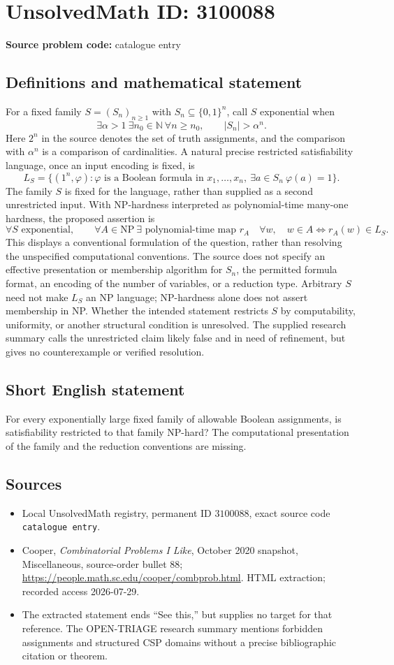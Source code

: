 \documentclass[11pt]{article}
\newcommand{\N}{\mathbb{N}}
\begin{document}
\section*{UnsolvedMath ID: 3100088}
\textbf{Source problem code:} catalogue entry
\subsection{Definitions and mathematical statement}
For a fixed family \(S=(S_n)_{n\ge1}\) with \(S_n\subseteq\{0,1\}^n\), call \(S\) exponential when
\[
\exists\alpha>1\ \exists n_0\in\N\ \forall n\ge n_0,\qquad |S_n|>\alpha^n.
\]
Here \(2^n\) in the source denotes the set of truth assignments, and the comparison with \(\alpha^n\) is a comparison of cardinalities. A natural precise restricted satisfiability language, once an input encoding is fixed, is
\[
L_S=\{(1^n,\varphi):\varphi\text{ is a Boolean formula in }x_1,\ldots,x_n,
\ \exists a\in S_n\ \varphi(a)=1\}.
\]
The family \(S\) is fixed for the language, rather than supplied as a second unrestricted input. With NP-hardness interpreted as polynomial-time many-one hardness, the proposed assertion is
\[
\forall S\text{ exponential},\qquad
\forall A\in\mathrm{NP}\ \exists\text{ polynomial-time map }r_A\quad
\forall w,\quad w\in A\iff r_A(w)\in L_S.
\]
This displays a conventional formulation of the question, rather than resolving the unspecified computational conventions. The source does not specify an effective presentation or membership algorithm for \(S_n\), the permitted formula format, an encoding of the number of variables, or a reduction type. Arbitrary \(S\) need not make \(L_S\) an NP language; NP-hardness alone does not assert membership in NP. Whether the intended statement restricts \(S\) by computability, uniformity, or another structural condition is unresolved. The supplied research summary calls the unrestricted claim likely false and in need of refinement, but gives no counterexample or verified resolution.
\subsection{Short English statement}
For every exponentially large fixed family of allowable Boolean assignments, is satisfiability restricted to that family NP-hard? The computational presentation of the family and the reduction conventions are missing.
\subsection{Sources}
\begin{itemize}
\item Local UnsolvedMath registry, permanent ID \(3100088\), exact source code \texttt{catalogue entry}.
\item Cooper, \emph{Combinatorial Problems I Like}, October 2020 snapshot, Miscellaneous, source-order bullet 88; \url{https://people.math.sc.edu/cooper/combprob.html}. HTML extraction; recorded access 2026-07-29.
\item The extracted statement ends ``See this,'' but supplies no target for that reference. The OPEN-TRIAGE research summary mentions forbidden assignments and structured CSP domains without a precise bibliographic citation or theorem.
\end{itemize}
\end{document}
